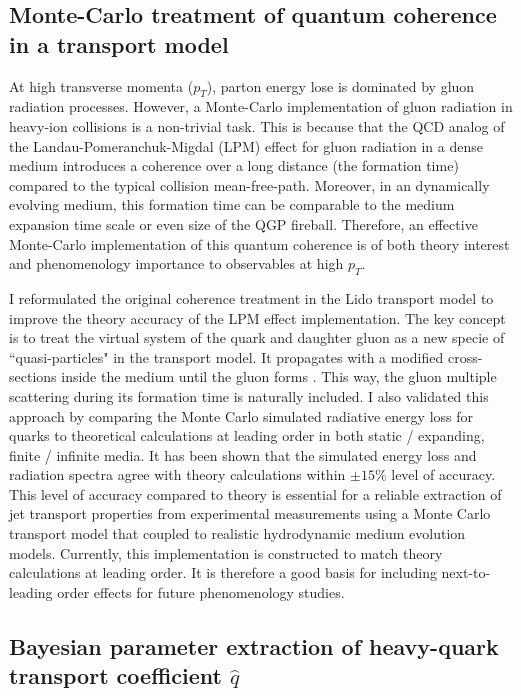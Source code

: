 \documentclass[10pt,a4paper]{article}
\begin{document}
\subsection{Monte-Carlo treatment of quantum coherence in a transport model}
At high transverse momenta ($p_T$), parton energy lose is dominated by gluon radiation processes. However, a Monte-Carlo implementation of gluon radiation in heavy-ion collisions is a non-trivial task. This is because that the QCD analog of the Landau-Pomeranchuk-Migdal (LPM) effect for gluon radiation in a dense medium introduces a coherence over a long distance (the formation time) compared to the typical collision mean-free-path. Moreover, in an dynamically evolving medium, this formation time can be comparable to the medium expansion time scale or even size of the QGP fireball. Therefore, an effective Monte-Carlo implementation of this quantum coherence is of both theory interest and phenomenology importance to observables at high $p_T$.


I reformulated the original coherence treatment in the Lido transport model to improve the theory accuracy of the LPM effect implementation.
The key concept is to treat the virtual system of the quark and daughter gluon as a new specie of ``quasi-particles" in the transport model. 
It propagates with a modified cross-sections inside the medium until the gluon forms \cite{Ke:2018jem}. 
This way, the gluon multiple scattering during its formation time is naturally included.
I also validated this approach by comparing the Monte Carlo simulated radiative energy loss for quarks to theoretical calculations at leading order in both static / expanding, finite / infinite media. 
It has been shown that the simulated energy loss and radiation spectra agree with theory calculations within $\pm 15\%$ level of accuracy. 
This level of accuracy compared to theory is essential for a reliable extraction of jet transport properties from experimental measurements using a Monte Carlo transport model that coupled to realistic hydrodynamic medium evolution models.
Currently, this implementation is constructed to match theory calculations at leading order. It is therefore a good basis for including next-to-leading order effects for future phenomenology studies.


\subsection{Bayesian parameter extraction of heavy-quark transport coefficient $\hat{q}$}
\end{document}
